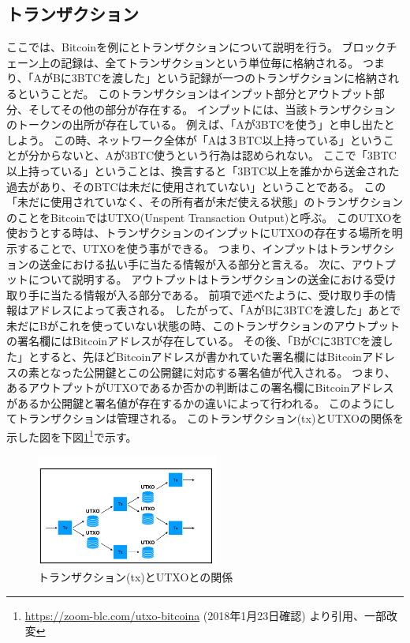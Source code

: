 \subsection{トランザクション}
ここでは、Bitcoinを例にとトランザクションについて説明を行う。
ブロックチェーン上の記録は、全てトランザクションという単位毎に格納される。
つまり、「AがBに3BTCを渡した」という記録が一つのトランザクションに格納されるということだ。
このトランザクションはインプット部分とアウトプット部分、そしてその他の部分が存在する。
インプットには、当該トランザクションのトークンの出所が存在している。
例えば、「Aが3BTCを使う」と申し出たとしよう。
この時、ネットワーク全体が「Aは３BTC以上持っている」ということが分からないと、Aが3BTC使うという行為は認められない。
ここで「3BTC以上持っている」ということは、換言すると「3BTC以上を誰かから送金された過去があり、そのBTCは未だに使用されていない」ということである。
この「未だに使用されていなく、その所有者が未だ使える状態」のトランザクションのことをBitcoinではUTXO(Unspent Transaction Output)と呼ぶ。
このUTXOを使おうとする時は、トランザクションのインプットにUTXOの存在する場所を明示することで、UTXOを使う事ができる。
つまり、インプットはトランザクションの送金における払い手に当たる情報が入る部分と言える。
次に、アウトプットについて説明する。
アウトプットはトランザクションの送金における受け取り手に当たる情報が入る部分である。
前項で述べたように、受け取り手の情報はアドレスによって表される。
したがって、「AがBに3BTCを渡した」あとで未だにBがこれを使っていない状態の時、このトランザクションのアウトプットの署名欄にはBitcoinアドレスが存在している。
その後、「BがCに3BTCを渡した」とすると、先ほどBitcoinアドレスが書かれていた署名欄にはBitcoinアドレスの素となった公開鍵とこの公開鍵に対応する署名値が代入される。
つまり、あるアウトプットがUTXOであるか否かの判断はこの署名欄にBitcoinアドレスがあるか公開鍵と署名値が存在するかの違いによって行われる。
このようにしてトランザクションは管理される。
このトランザクション(tx)とUTXOの関係を示した図を下図\ref{UTXO}\footnote{\url{https://zoom-blc.com/utxo-bitcoina} (2018年1月23日確認) より引用、一部改変}で示す。
\begin{figure}[htbp]
 \centering
  \includegraphics[width=60mm]{image/UTXO.png}
 \caption{トランザクション(tx)とUTXOとの関係}
 \label{UTXO}
\end{figure}

